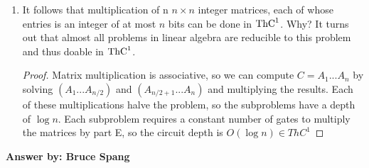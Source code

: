 \documentclass[12pt]{article}
\begin{document}
\begin{enumerate}
\begin{enumerate}
    \begin{proof}
      Let $A$, $B$ be the input matrices, and $C$ be the resulting matrix. Matrix multiplication is defined as $C_{ij} = \sum_{k=1}^n{A_{ik}*B_{ki}}$. Each multiplication in the sum can be done in $ThC^0$ by part D, and the addition of $n$ numbers can be done in $ThC^0$ by part C. Each index can be done in parallel, so the whole thing is in $ThC^0$
    \end{proof}

  \item It follows that multiplication of n $n\times n$ integer matrices, each of whose entries is an integer of at most $n$ bits can be done in  $\mbox{{\rm ThC}}^1$.  Why? It turns out that almost all problems in linear algebra are reducible to this problem and thus doable in $\mbox{{\rm ThC}}^1$.

    \begin{proof}
      Matrix multiplication is associative, so we can compute $C = A_1...A_n$ by solving $(A_1...A_{n/2})$ and $(A_{n/2+1}...A_n)$ and multiplying the results. Each of these multiplications halve the problem, so the subproblems have a depth of $\log{n}$. Each subproblem requires a constant number of gates to multiply the matrices by part E, so the circuit depth is $O(\log{n}) \in ThC^1$
    \end{proof}
  \end{enumerate}

  {\bf Answer by: Bruce Spang} 

\end{enumerate}
\end{document}
